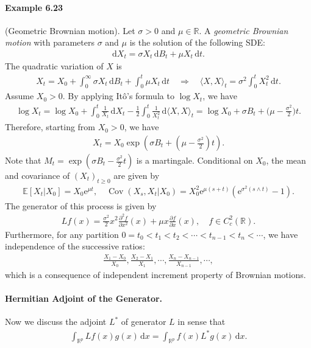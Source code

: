 \documentclass{article}
\numberwithin{equation}{section}
\newcommand{\e}{\mathrm{e}}
\newcommand{\E}{\mathbb{E}}
\DeclareMathOperator{\cov}{Cov}
\renewcommand{\d}{\mathrm{d}}
\theoremstyle{plain}
\theoremstyle{definition}
\begin{document}
\paragraph{Example 6.23\label{example:6.23}} (Geometric Brownian motion). Let $\sigma>0$ and $\mu\in\mathbb{R}$. A \textit{geometric Brownian motion} with parameters $\sigma$ and $\mu$ is the solution of the following SDE:
\begin{align*}
	\d X_t = \sigma X_t\,\d B_t + \mu X_t\,\d t.
\end{align*}
The quadratic variation of $X$ is
\begin{align*}
	X_t = X_0 + \int_0^\infty\sigma X_t\,\d B_t + \int_0^t\mu X_t\,\d t\quad\Rightarrow\quad \langle X,X\rangle_t = \sigma^2\int_0^t X_t^2\,\d t.
\end{align*}
Assume $X_0>0$. By applying Itô's formula to $\log X_t$, we have
\begin{align*}
	\log X_t = \log X_0 + \int_0^t\frac{1}{X_t}\,\d X_t - \frac{1}{2}\int_0^t\frac{1}{X_t^2}\,\d\langle X,X\rangle_t=\log X_0 + \sigma B_t + \biggl(\mu -\frac{\sigma^2}{2}\biggr)t.
\end{align*}
Therefore, starting from $X_0>0$, we have 
\begin{align*}
	X_t = X_0\exp\left(\sigma B_t + \left(\mu -\frac{\sigma^2}{2}\right)t\right).
\end{align*}
Note that $M_t=\exp\left(\sigma B_t - \frac{\sigma^2}{2}t\right)$ is a martingale. Conditional on $X_0$, the mean and covariance of $(X_t)_{t\geq 0}$ are given by
\begin{align*}
	\E[X_t|X_0] = X_0\e^{\mu t},\quad \cov(X_s,X_t|X_0) = X_0^2\e^{\mu(s+t)}\left(\e^{\sigma^2(s\wedge t)}-1\right).
\end{align*}
The generator of this process is given by
\begin{align*}
	Lf(x) = \frac{\sigma^2}{2}x^2\frac{\partial^2 f}{\partial x^2}(x) + \mu x\frac{\partial f}{\partial x}(x),\quad f\in C_c^2(\mathbb{R}).
\end{align*}
Furthermore, for any partition $0=t_0<t_1<t_2<\cdots<t_{n-1}<t_n<\cdots$, we have independence of the successive ratios:
\begin{align*}
	\frac{X_1-X_0}{X_0},\frac{X_2-X_1}{X_1},\cdots,\frac{X_n-X_{n-1}}{X_{n-1}},\cdots,
\end{align*}
which is a consequence of independent increment property of Brownian motions.

\paragraph{Hermitian Adjoint of the Generator.} Now we discuss the adjoint $L^*$ of generator $L$ in sense that
\begin{align*}
	\int_{\mathbb{R}^p} Lf(x)g(x)\,\d x = \int_{\mathbb{R}^p} f(x)L^*g(x)\,\d x.
\end{align*}
\end{document}

